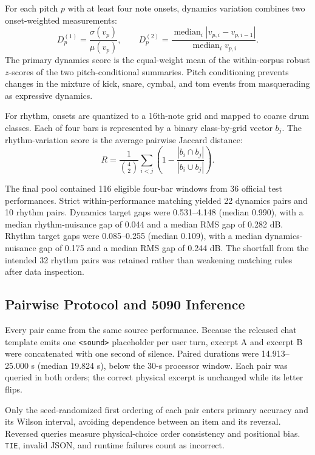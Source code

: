 For each pitch $p$ with at least four note onsets, dynamics variation combines
two onset-weighted measurements:
\begin{equation}
  D_p^{(1)} = \frac{\sigma(v_p)}{\mu(v_p)}, \qquad
  D_p^{(2)} = \frac{\operatorname{median}_i |v_{p,i}-v_{p,i-1}|}
  {\operatorname{median}_i v_{p,i}}.
\end{equation}
The primary dynamics score is the equal-weight mean of the within-corpus robust
$z$-scores of the two pitch-conditional summaries. Pitch conditioning prevents
changes in the mixture of kick, snare, cymbal, and tom events from masquerading
as expressive dynamics.

For rhythm, onsets are quantized to a 16th-note grid and mapped to coarse drum
classes. Each of four bars is represented by a binary class-by-grid vector
$b_j$. The rhythm-variation score is the average pairwise Jaccard distance:
\begin{equation}
  R = \frac{1}{\binom{4}{2}}\sum_{i<j}
  \left(1-\frac{|b_i\cap b_j|}{|b_i\cup b_j|}\right).
\end{equation}

The final pool contained 116 eligible four-bar windows from 36 official test
performances. Strict within-performance matching yielded 22 dynamics pairs and
10 rhythm pairs. Dynamics target gaps were 0.531--4.148 (median 0.990), with a
median rhythm-nuisance gap of 0.044 and a median RMS gap of 0.282 dB. Rhythm
target gaps were 0.085--0.255 (median 0.109), with a median dynamics-nuisance
gap of 0.175 and a median RMS gap of 0.244 dB. The shortfall from the intended
32 rhythm pairs was retained rather than weakening matching rules after data
inspection.

\subsection{Pairwise Protocol and 5090 Inference}

Every pair came from the same source performance. Because the released chat
template emits one \texttt{<sound>} placeholder per user turn, excerpt A and
excerpt B were concatenated with one second of silence. Paired durations were
14.913--25.000 s (median 19.824 s), below the 30-s processor window. Each pair
was queried in both orders; the correct physical excerpt is unchanged while its
letter flips.

Only the seed-randomized first ordering of each pair enters primary accuracy and
its Wilson interval, avoiding dependence between an item and its reversal.
Reversed queries measure physical-choice order consistency and positional bias.
\texttt{TIE}, invalid JSON, and runtime failures count as incorrect.

